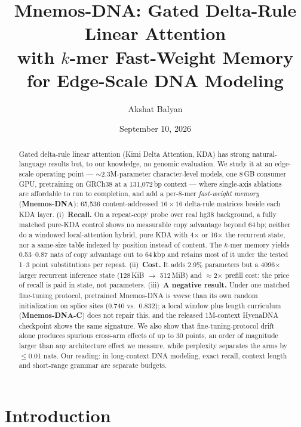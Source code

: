 \documentclass[11pt]{article}
\title{\bfseries Mnemos-DNA: Gated Delta-Rule Linear Attention\\
with $k$-mer Fast-Weight Memory for Edge-Scale DNA Modeling}
\author{Akshat Balyan}
\date{September 10, 2026}
\theoremstyle{plain}
\begin{document}
\maketitle

\begingroup
\renewcommand\thefootnote{}\endgroup

\begin{abstract}
Gated delta-rule linear attention (Kimi Delta Attention, KDA) has strong natural-language results
but, to our knowledge, no genomic evaluation. We study it at an edge-scale operating point ---
$\sim$2.3M-parameter character-level models, one 8\,GB consumer GPU, pretraining on GRCh38 at a
131{,}072\,bp context --- where single-axis ablations are affordable to run to completion, and add
a per-8-mer \emph{fast-weight memory} (\textbf{Mnemos-DNA}): 65{,}536 content-addressed
$16\times16$ delta-rule matrices beside each KDA layer.
(i)~\textbf{Recall.} On a repeat-copy probe over real hg38 background, a fully matched pure-KDA
control shows no measurable copy advantage beyond 64\,bp; neither do a windowed local-attention
hybrid, pure KDA with 4$\times$ or 16$\times$ the recurrent state, nor a same-size table indexed by
position instead of content. The $k$-mer memory yields 0.53--0.87 nats of copy advantage out to
64\,kbp and retains most of it under the tested 1--3 point substitutions per repeat.
(ii)~\textbf{Cost.} It adds 2.9\% parameters but a 4096$\times$ larger recurrent inference state
(128\,KiB $\to$ 512\,MiB) and $\approx$2$\times$ prefill cost: the price of recall is paid in
state, not parameters.
(iii)~\textbf{A negative result.} Under one matched fine-tuning protocol, pretrained Mnemos-DNA is
\emph{worse} than its own random initialization on splice sites (0.740 vs.\ 0.832); a local
window plus length curriculum (\textbf{Mnemos-DNA-C}) does not repair this, and the released
1M-context HyenaDNA checkpoint shows the same signature.
We also show that fine-tuning-protocol drift alone produces spurious cross-arm effects of up to
30 points, an order of magnitude larger than any architecture effect we measure, while
perplexity separates the arms by $\le$0.01 nats. Our reading: in long-context DNA modeling,
exact recall, context length and short-range grammar are separate budgets.
\end{abstract}

\section{Introduction}\label{sec:intro}
\end{document}
